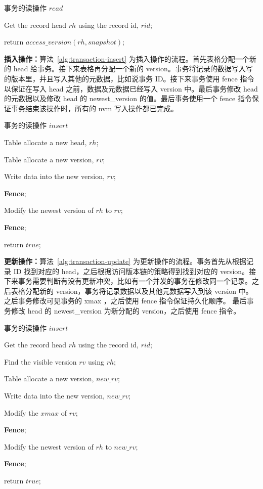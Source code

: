 \begin{algorithm}[h]
    \caption{事务的读操作 $read$}
    \label{alg:transaction-read}
    \BlankLine
    Get the record head $rh$ using the record id, $rid$;

    return $access\_version(rh, snapshot)$;

\end{algorithm}

\textbf{插入操作：}算法~\ref{alg:transaction-insert} 为插入操作的流程。首先表格分配一个新的 head 给事务。接下来表格再分配一个新的 version。事务将记录的数据写入写的版本里，并且写入其他的元数据，比如说事务 ID。接下来事务使用 fence 指令以保证在写入 head 之前，数据及元数据已经写入 version 中。最后事务修改 head 的元数据以及修改 head 的 newest\_version 的值。最后事务使用一个 fence 指令保证事务结束该操作时，所有的 nvm 写入操作都已完成。

\begin{algorithm}[h]
    \caption{事务的读操作 $insert$}
    \label{alg:transaction-insert}
    \BlankLine
    Table allocate a new head, $rh$;

    Table allocate a new version, $rv$;

    Write data into the new version, $rv$;

    \textbf{Fence};

    Modify the newest version of $rh$ to $rv$;

    \textbf{Fence};

    return $true$;

\end{algorithm}

\textbf{更新操作：}算法~\ref{alg:transaction-update} 为更新操作的流程。事务首先从根据记录 ID 找到对应的 head，之后根据访问版本链的策略得到找到对应的 version。接下来事务需要判断有没有更新冲突，比如有一个并发的事务在修改同一个记录。之后表格分配新的 version，事务将记录数据以及其他元数据写入到该 version 中。之后事务修改可见事务的 xmax ，之后使用 fence 指令保证持久化顺序。
最后事务修改 head 的 newest\_version 为新分配的 version，之后使用 fence 指令。

\begin{algorithm}[h]
    \caption{事务的读操作 $insert$}
    \label{alg:transaction-update}
    \BlankLine
    Get the record head $rh$ using the record id, $rid$;

    Find the visible version $rv$ using $rh$;


    Table allocate a new version, $new\_rv$;

    Write data into the new version, $new\_rv$;

    Modify the $xmax$ of $rv$;

    \textbf{Fence};

    Modify the newest version of $rh$ to $new\_rv$;

    \textbf{Fence};

    return $true$;

\end{algorithm}


